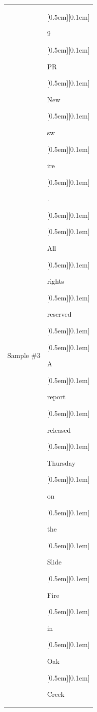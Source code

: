 \begin{table}[ht]
\begin{tabular}{@{}l p{13cm}@{}}
\vspace{10pt}
Sample \#3 &
{\setlength{\fboxsep}{1pt}\raisebox{0pt}[0.5em][0.1em]{\colorbox{Salmon!60}{\strut{9}}}}{\setlength{\fboxsep}{1pt}\raisebox{0pt}[0.5em][0.1em]{\colorbox{DarkOrchid!25}{\strut{ PR}}}}{\setlength{\fboxsep}{1pt}\raisebox{0pt}[0.5em][0.1em]{\colorbox{DarkOrchid!25}{\strut{ New}}}}{\setlength{\fboxsep}{1pt}\raisebox{0pt}[0.5em][0.1em]{\colorbox{DarkOrchid!25}{\strut{sw}}}}{\setlength{\fboxsep}{1pt}\raisebox{0pt}[0.5em][0.1em]{\colorbox{Salmon!60}{\strut{ire}}}}{\setlength{\fboxsep}{1pt}\raisebox{0pt}[0.5em][0.1em]{\colorbox{DarkOrchid!25}{\strut{.}}}}{\setlength{\fboxsep}{1pt}\raisebox{0pt}[0.5em][0.1em]{\colorbox{DarkOrchid!25}{\strut{ }}}}{\setlength{\fboxsep}{1pt}\raisebox{0pt}[0.5em][0.1em]{\colorbox{DarkOrchid!25}{\strut{All}}}}{\setlength{\fboxsep}{1pt}\raisebox{0pt}[0.5em][0.1em]{\colorbox{DarkOrchid!25}{\strut{ rights}}}}{\setlength{\fboxsep}{1pt}\raisebox{0pt}[0.5em][0.1em]{\colorbox{DarkOrchid!25}{\strut{ reserved}}}}{\setlength{\fboxsep}{1pt}\raisebox{0pt}[0.5em][0.1em]{\colorbox{DarkOrchid!25}{\strut{}}}}{\setlength{\fboxsep}{1pt}\raisebox{0pt}[0.5em][0.1em]{\colorbox{DarkOrchid!25}{\strut{A}}}}{\setlength{\fboxsep}{1pt}\raisebox{0pt}[0.5em][0.1em]{\colorbox{DarkOrchid!25}{\strut{ report}}}}{\setlength{\fboxsep}{1pt}\raisebox{0pt}[0.5em][0.1em]{\colorbox{DarkOrchid!25}{\strut{ released}}}}{\setlength{\fboxsep}{1pt}\raisebox{0pt}[0.5em][0.1em]{\colorbox{DarkOrchid!25}{\strut{ Thursday}}}}{\setlength{\fboxsep}{1pt}\raisebox{0pt}[0.5em][0.1em]{\colorbox{SkyBlue!55}{\strut{ on}}}}{\setlength{\fboxsep}{1pt}\raisebox{0pt}[0.5em][0.1em]{\colorbox{SkyBlue!55}{\strut{ the}}}}{\setlength{\fboxsep}{1pt}\raisebox{0pt}[0.5em][0.1em]{\colorbox{Salmon!60}{\strut{ Slide}}}}{\setlength{\fboxsep}{1pt}\raisebox{0pt}[0.5em][0.1em]{\colorbox{Salmon!60}{\strut{ Fire}}}}{\setlength{\fboxsep}{1pt}\raisebox{0pt}[0.5em][0.1em]{\colorbox{SkyBlue!55}{\strut{ in}}}}{\setlength{\fboxsep}{1pt}\raisebox{0pt}[0.5em][0.1em]{\colorbox{SkyBlue!55}{\strut{ Oak}}}}{\setlength{\fboxsep}{1pt}\raisebox{0pt}[0.5em][0.1em]{\colorbox{Salmon!60}{\strut{ Creek}}}}


\end{tabular}
\end{table}
